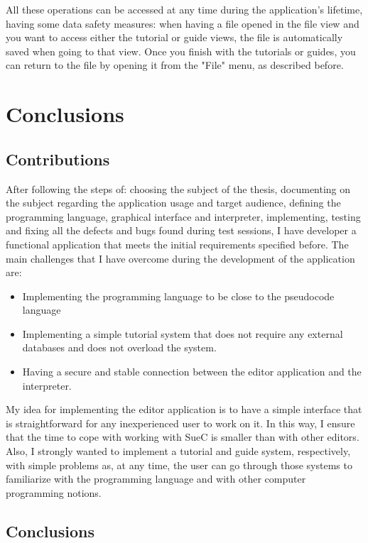 \documentclass[12pt,a4paper,twoside]{report}
\begin{document}
All these operations can be accessed at any time during the application's lifetime, having some data safety measures: when having a file opened in the file view and you want to access either the tutorial or guide views, the file is automatically saved when going to that view. Once you finish with the tutorials or guides, you can return to the file by opening it from the "File" menu, as described before. 
\chapter{Conclusions}

\section{Contributions}

After following the steps of: choosing the subject of the thesis, documenting on the subject regarding the application usage and target audience, defining the programming language, graphical interface and interpreter, implementing, testing and fixing all the defects and bugs found during test sessions, I have developer a functional application that meets the initial requirements specified before. The main challenges that I have overcome during the development of the application are: 
\begin{itemize}
 \item Implementing the programming language to be close to the pseudocode language
 \item Implementing a simple tutorial system that does not require any external databases and does not overload the system.
 \item Having a secure and stable connection between the editor application and the interpreter.
\end{itemize}

My idea for implementing the editor application is to have a simple interface that is straightforward for any inexperienced user to work on it. In this way, I ensure that the time to cope with working with SueC is smaller than with other editors. Also, I strongly wanted to implement a tutorial and guide system, respectively, with simple problems as, at any time, the user can go through those systems to familiarize with the programming language and with other computer programming notions.

\section{Conclusions}
\end{document}
